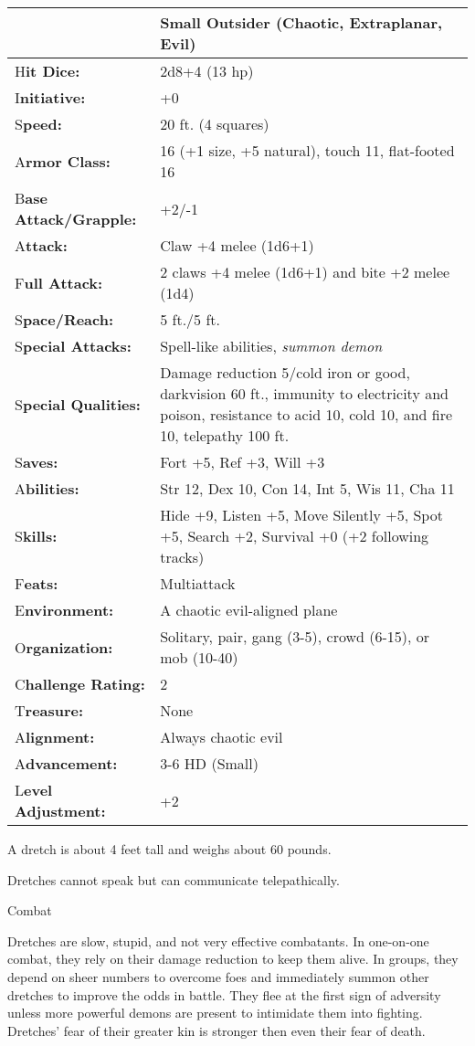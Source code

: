 \documentclass{article}
\begin{document}
\begin{tabular}{|>{\raggedright}p{91pt}|>{\raggedright}p{200pt}|}
\hline
  & Small Outsider (Chaotic, Extraplanar, Evil)\tabularnewline
\hline
H\textbf{it Dice:} & 2d8+4 (13 hp)\tabularnewline
\hline
I\textbf{nitiative:} & +0\tabularnewline
\hline
S\textbf{peed:} & 20 ft. (4 squares)\tabularnewline
\hline
A\textbf{rmor Class:} & 16 (+1 size, +5 natural), touch 11, flat-footed 16\tabularnewline
\hline
B\textbf{ase Attack/Grapple:} & +2/-1\tabularnewline
\hline
A\textbf{ttack:} & Claw +4 melee (1d6+1)\tabularnewline
\hline
F\textbf{ull Attack:} & 2 claws +4 melee (1d6+1) and bite +2 melee (1d4)\tabularnewline
\hline
S\textbf{pace/Reach:} & 5 ft./5 ft.\tabularnewline
\hline
S\textbf{pecial Attacks:} & Spell-like abilities, \textit{summon demon}\tabularnewline
\hline
S\textbf{pecial Qualities:} & Damage reduction 5/cold iron or good, darkvision 
60 ft., immunity to electricity and poison, resistance to acid 10, cold 10, and 
fire 10, telepathy 100 ft.\tabularnewline
\hline
S\textbf{aves:} & Fort +5, Ref +3, Will +3\tabularnewline
\hline
A\textbf{bilities:} & Str 12, Dex 10, Con 14, Int 5, Wis 11, Cha 11\tabularnewline
\hline
S\textbf{kills:} & Hide +9, Listen +5, Move Silently +5, Spot +5, Search +2, Survival 
+0 (+2 following tracks)\tabularnewline
\hline
F\textbf{eats:} & Multiattack\tabularnewline
\hline
E\textbf{nvironment:} & A chaotic evil-aligned plane\tabularnewline
\hline
O\textbf{rganization:} & Solitary, pair, gang (3-5), crowd (6-15), or mob (10-40)\tabularnewline
\hline
C\textbf{hallenge Rating:} & 2\tabularnewline
\hline
T\textbf{reasure:} & None\tabularnewline
\hline
A\textbf{lignment:} & Always chaotic evil\tabularnewline
\hline
A\textbf{dvancement:} & 3-6 HD (Small)\tabularnewline
\hline
L\textbf{evel Adjustment:} & +2\tabularnewline
\hline
\end{tabular}

A dretch is about 4 feet tall and weighs about 60 pounds.

Dretches cannot speak but can communicate telepathically.

Combat

Dretches are slow, stupid, and not very effective combatants. In one-on-one combat, 
they rely on their damage reduction to keep them alive. In groups, they depend 
on sheer numbers to overcome foes and immediately summon other dretches to improve 
the odds in battle. They flee at the first sign of adversity unless more powerful 
demons are present to intimidate them into fighting. Dretches' fear of their greater 
kin is stronger then even their fear of death.
\end{document}
